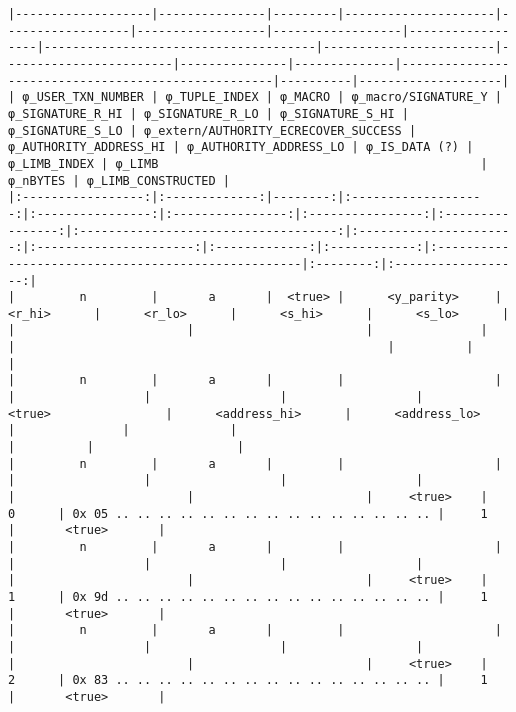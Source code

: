 \documentclass[varwidth=\maxdimen,margin=0.5cm,multi={verbatim}]{standalone}
\begin{document}
\begin{verbatim}
|-------------------|---------------|---------|---------------------|------------------|------------------|------------------|------------------|--------------------------------------|------------------------|------------------------|---------------|--------------|----------------------------------------------------|----------|--------------------|
| φ_USER_TXN_NUMBER | φ_TUPLE_INDEX | φ_MACRO | φ_macro/SIGNATURE_Y | φ_SIGNATURE_R_HI | φ_SIGNATURE_R_LO | φ_SIGNATURE_S_HI | φ_SIGNATURE_S_LO | φ_extern/AUTHORITY_ECRECOVER_SUCCESS | φ_AUTHORITY_ADDRESS_HI | φ_AUTHORITY_ADDRESS_LO | φ_IS_DATA (?) | φ_LIMB_INDEX | φ_LIMB                                             | φ_nBYTES | φ_LIMB_CONSTRUCTED |
|:-----------------:|:-------------:|--------:|:-------------------:|:----------------:|:----------------:|:----------------:|:----------------:|:------------------------------------:|:----------------------:|:----------------------:|:-------------:|:------------:|:---------------------------------------------------|:--------:|:------------------:|
|         n         |       a       |  <true> |      <y_parity>     |      <r_hi>      |      <r_lo>      |      <s_hi>      |      <s_lo>      |                                      |                        |                        |               |              |                                                    |          |                    |
|         n         |       a       |         |                     |                  |                  |                  |                  |                <true>                |      <address_hi>      |      <address_lo>      |               |              |                                                    |          |                    |
|         n         |       a       |         |                     |                  |                  |                  |                  |                                      |                        |                        |     <true>    |       0      | 0x 05 .. .. .. .. .. .. .. .. .. .. .. .. .. .. .. |     1    |       <true>       |
|         n         |       a       |         |                     |                  |                  |                  |                  |                                      |                        |                        |     <true>    |       1      | 0x 9d .. .. .. .. .. .. .. .. .. .. .. .. .. .. .. |     1    |       <true>       |
|         n         |       a       |         |                     |                  |                  |                  |                  |                                      |                        |                        |     <true>    |       2      | 0x 83 .. .. .. .. .. .. .. .. .. .. .. .. .. .. .. |     1    |       <true>       |

\end{verbatim}
\end{document}
